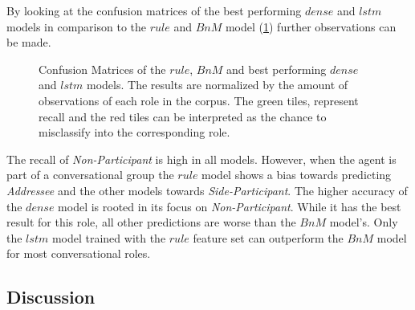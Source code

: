 By looking at the confusion matrices of the best performing \(dense\) and \(lstm\) models in comparison to the \(rule\) and \(BnM\) model (\cref{fig:role-cm}) further observations can be made.  
\begin{figure}[htb!]
    \centering
    \begin{footnotesize}
    
    \end{footnotesize}
    \caption[Confusion Matrices of Best Role Models.]{\label{fig:role-cm} 
    Confusion Matrices of the \(rule\), \(BnM\) and best performing \(dense\) and \(lstm\) models.
    The results are normalized by the amount of observations of each role in the corpus.
    The green tiles, represent \gls{recall} and the red tiles can be interpreted as the chance to misclassify into the corresponding role.
    }
\end{figure}
%
The \gls{recall} of \emph{Non-Participant} is high in all models.
%
However, when the agent is part of a \gls{conversational group} the \(rule\) model shows a bias towards predicting \emph{Addressee} and the other models towards \emph{Side-Participant}.
%
The higher accuracy of the \(dense\) model is rooted in its focus on \emph{Non-Participant}. 
While it has the best result for this role, all other predictions are worse than the \(BnM\) model's.
%
Only the \(lstm\) model trained with the \(rule\) feature set can outperform the \(BnM\) model for most \glspl{conversational role}.

\subsection{Discussion}

